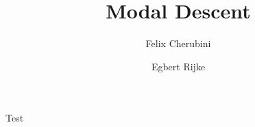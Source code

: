 \documentclass{msc}
\title{Modal Descent}
\author{Felix Cherubini}
\affiliation{Softwareschneiderei GmbH
    \email{felix.cherubini@posteo.de}}
\author{Egbert Rijke}
\affiliation{Fill
    \email{fill}}
\begin{document}
Test
\end{document}
